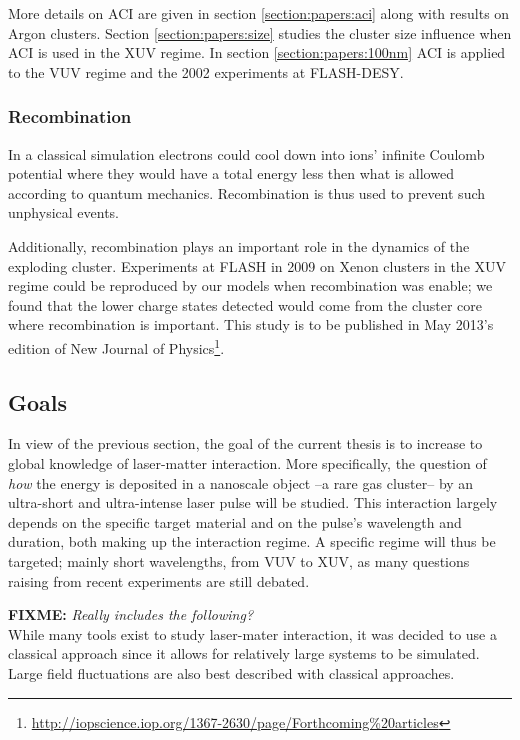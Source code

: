 More details on ACI are given in section \ref{section:papers:aci} along with
results on Argon clusters. Section \ref{section:papers:size} studies the cluster
size influence when ACI is used in the XUV regime. In section
\ref{section:papers:100nm} ACI is applied to the VUV regime and the
2002 experiments at FLASH-DESY.

\subsubsection{Recombination}
In a classical simulation electrons could cool down into ions' infinite Coulomb
potential where they would have a total energy less then what is allowed
according to quantum mechanics. Recombination is thus used to prevent such
unphysical events.

Additionally, recombination plays an important role in the dynamics of the
exploding cluster. Experiments at FLASH in 2009 on Xenon clusters in the XUV
regime\cite{Thomas2009} could be reproduced by our models when recombination
was enable; we found that the lower charge states detected would come from the
cluster core where recombination is important. This study is to be published in
May 2013's edition of New Journal of
Physics\footnote{\url{http://iopscience.iop.org/1367-2630/page/Forthcoming\%20articles}}.


\subsection{Goals}

In view of the previous section, the goal of the current thesis is to increase
to global knowledge of laser-matter interaction. More specifically, the
question of \textit{how} the energy is deposited in a nanoscale object
--a rare gas cluster-- by an
ultra-short and ultra-intense laser pulse will be studied. This interaction
largely depends on the specific target material and on the pulse's wavelength
and duration, both making up the interaction regime. A specific regime will
thus be targeted; mainly short wavelengths, from VUV to XUV, as many questions
raising from recent experiments are still debated.

\textbf{FIXME:} \textit{Really includes the following?}\\
While many tools exist to study laser-mater interaction, it was decided to use
a classical approach since it allows for relatively large systems to be
simulated. Large field fluctuations are also best described with
classical approaches\cite{Fennel2010}.



